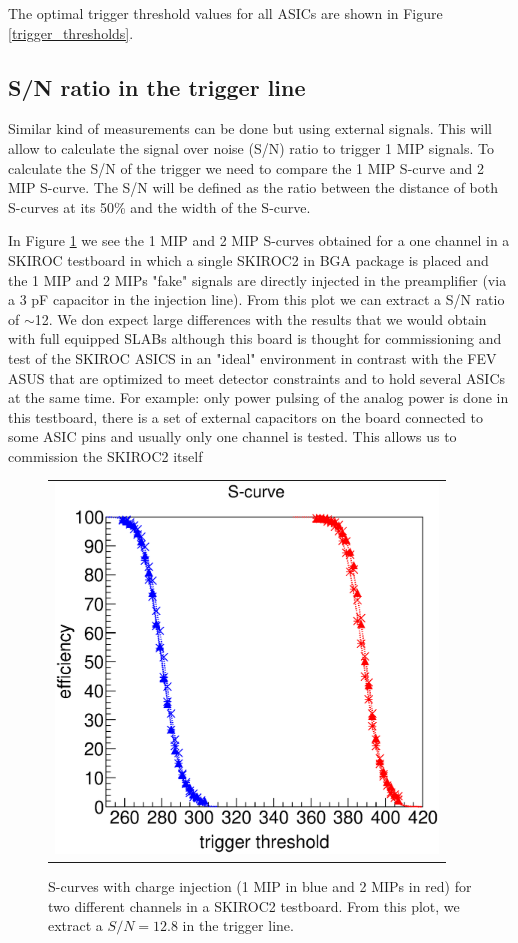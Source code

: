 \documentclass[a4paper,11pt]{article}
\begin{document}
The optimal trigger threshold values for all ASICs are shown in Figure \ref{trigger_thresholds}.


\subsection{S/N ratio in the trigger line}
\label{sec:comm_trigger_sn}

Similar kind of measurements can be done but using external signals. 
This will allow to calculate the signal over noise (S/N) ratio to trigger 1 MIP signals.
To calculate the S/N of the trigger we need to compare the 1 MIP S-curve and 2 MIP S-curve. The S/N 
will be defined as the ratio between the distance of both S-curves at its 50\% and the width of the 
S-curve.

In Figure \ref{scurves_injection} we see the 1 MIP and 2 MIP S-curves obtained for a one channel
in a SKIROC testboard in which a single SKIROC2 in BGA package is placed and the 1 MIP and 2 MIPs 
"fake" signals are directly injected in the preamplifier (via a 3 pF capacitor in the injection line). 
From this plot we can extract a S/N ratio of $\sim$12. 
We don expect large differences with the results that we would obtain with 
full equipped SLABs 
although this board is thought for commissioning and test of the SKIROC ASICS in an
"ideal" environment in contrast with the FEV
ASUS that are optimized to meet detector constraints and to hold several ASICs at the same time.
For example: only power pulsing of the analog power is done in this testboard,
there is a set of external capacitors on the board connected to some ASIC pins and
usually only one channel is tested. This allows us to commission the SKIROC2 itself

\begin{figure}[!t]
    \centering
  \begin{tabular}{l}
	\includegraphics[width=4in]{figs/commissioning/scurve_pp_fastshaper_ch.eps} \\
	\end{tabular}
\caption{S-curves with charge injection (1 MIP in blue and 2 MIPs in red) for two different channels in a SKIROC2 testboard. From this plot, we extract a $S/N = 12.8$ in the trigger line.}
\label{scurves_injection}
\end{figure}
\end{document}
